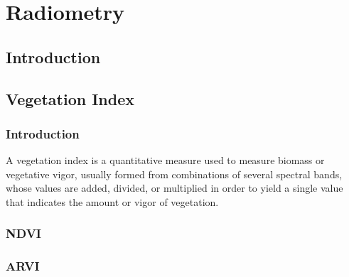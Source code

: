 \chapter{ Radiometry }
\section{Introduction}


\section{Vegetation Index}
\label{sec:VegetationIndex}

\subsection{Introduction}
A vegetation index is a quantitative measure used to measure biomass or vegetative vigor, 
usually formed from combinations of several spectral bands, whose values are added, divided, 
or multiplied in order to yield a single value that indicates the amount or vigor of vegetation. 

\subsection{NDVI}
\label{secNDVI}


\subsection{ARVI}
\label{secARVI}




